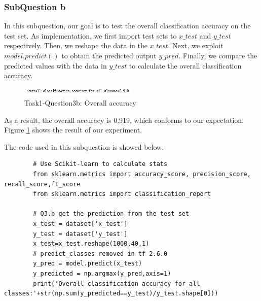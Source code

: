 \documentclass[conference]{IEEEtran}
\begin{document}
	\subsubsection{SubQuestion b}
	In this subquestion, our goal is to test the overall classification accuracy on the test set. As implementation, we first import test sets to $x\_test$ and $y\_test$ respectively. Then, we reshape the data in the $x\_test$. Next, we exploit $model.predict()$ to obtain the predicted output $y\_pred$. Finally, we compare the predicted values with the data in $y\_test$ to calculate the overall classification accuracy.\par
	\begin{figure}[h] 
		\centering
		\includegraphics[width=0.5\textwidth]{./graphs/T1Q3b.png}
		\caption{Task1-Question3b: Overall accuracy} 
		\label{Fig.t1q3b} 
	\end{figure}
	
	As a result, the overall accuracy is 0.919, which conforms to our expectation. Figure \ref{Fig.t1q3b} shows the result of our experiment.\par
	The code used in this subquestion is showed below.
	
	\begin{lstlisting}
		# Use Scikit-learn to calculate stats
		from sklearn.metrics import accuracy_score, precision_score, recall_score,f1_score
		from sklearn.metrics import classification_report
		
		# Q3.b get the prediction from the test set
		x_test = dataset['x_test']
		y_test = dataset['y_test']
		x_test=x_test.reshape(1000,40,1)
		# predict_classes removed in tf 2.6.0
		y_pred = model.predict(x_test)
		y_predicted = np.argmax(y_pred,axis=1)
		print('Overall classification accuracy for all classes:'+str(np.sum(y_predicted==y_test)/y_test.shape[0]))
	\end{lstlisting}
	
	
	
\end{document}
